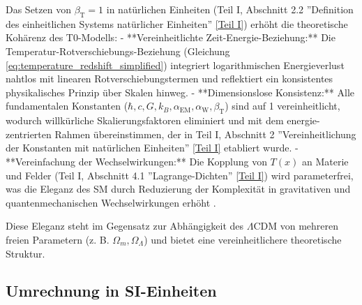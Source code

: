 \documentclass[12pt,a4paper]{article}
\newcommand{\Tfield}{T(x)}
\newcommand{\alphaEM}{\alpha_{\text{EM}}}
\newcommand{\alphaW}{\alpha_{\text{W}}}
\newcommand{\betaT}{\beta_{\text{T}}}
\begin{document}
	Das Setzen von \(\betaT = 1\) in natürlichen Einheiten (Teil I, Abschnitt 2.2 ''Definition des einheitlichen Systems natürlicher Einheiten'' \href{https://github.com/jpascher/T0-Time-Mass-Duality/tree/main/2/pdf/Deutsch/Bridging Quantum Mechanics and Relativity through Time-Mass Duality Part I Theoretical Foundations.pdf}{[Teil I]}) erhöht die theoretische Kohärenz des T0-Modells:
	- **Vereinheitlichte Zeit-Energie-Beziehung:** Die Temperatur-Rotverschiebungs-Beziehung (Gleichung \ref{eq:temperature_redshift_simplified}) integriert logarithmischen Energieverlust nahtlos mit linearen Rotverschiebungstermen und reflektiert ein konsistentes physikalisches Prinzip über Skalen hinweg.
	- **Dimensionslose Konsistenz:** Alle fundamentalen Konstanten (\(\hbar, c, G, k_B, \alphaEM, \alphaW, \betaT\)) sind auf 1 vereinheitlicht, wodurch willkürliche Skalierungsfaktoren eliminiert und mit dem energie-zentrierten Rahmen übereinstimmen, der in Teil I, Abschnitt 2 ''Vereinheitlichung der Konstanten mit natürlichen Einheiten'' \href{https://github.com/jpascher/T0-Time-Mass-Duality/tree/main/2/pdf/Deutsch/Bridging Quantum Mechanics and Relativity through Time-Mass Duality Part I Theoretical Foundations.pdf}{[Teil I]} etabliert wurde.
	- **Vereinfachung der Wechselwirkungen:** Die Kopplung von \(\Tfield\) an Materie und Felder (Teil I, Abschnitt 4.1 ''Lagrange-Dichten'' \href{https://github.com/jpascher/T0-Time-Mass-Duality/tree/main/2/pdf/Deutsch/Bridging Quantum Mechanics and Relativity through Time-Mass Duality Part I Theoretical Foundations.pdf}{[Teil I]}) wird parameterfrei, was die Eleganz des SM durch Reduzierung der Komplexität in gravitativen und quantenmechanischen Wechselwirkungen erhöht \cite{pascher_alphabeta_2025}.
	
	Diese Eleganz steht im Gegensatz zur Abhängigkeit des \(\Lambda\)CDM von mehreren freien Parametern (z. B. \(\Omega_m, \Omega_{\Lambda}\)) und bietet eine vereinheitlichere theoretische Struktur.
	
	\subsection{Umrechnung in SI-Einheiten}
	\label{subsec:conversion_si}
	
\end{document}

